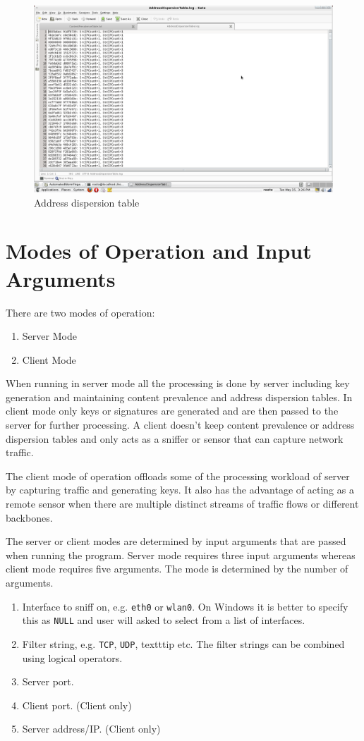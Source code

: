 \documentclass{report}
\begin{document}
\begin{figure}[here]
\centering
\includegraphics[width=\textwidth]{AddressDispersionTable.png}
\caption{Address dispersion table}
\label{AddressDispersionLog}
\end{figure}

\section{Modes of Operation and Input Arguments}
There are two modes of operation:
\begin{enumerate}
\item Server Mode
\item Client Mode
\end{enumerate}

When running in server mode all the processing is done by server including key generation and maintaining content prevalence and address dispersion tables. In client mode only keys or signatures are generated and are then passed to the server for further processing. A client doesn't keep content prevalence or address dispersion tables and only acts as a sniffer or sensor that can capture network traffic.

The client mode of operation offloads some of the processing workload of server by capturing traffic and generating keys. It also has the advantage of acting as a remote sensor when there are multiple distinct streams of traffic flows or different backbones.

The server or client modes are determined by input arguments that are passed when running the program. Server mode requires three input arguments whereas client mode requires five arguments. The mode is determined by the number of arguments.
\begin{enumerate}
\item Interface to sniff on, e.g. \texttt{eth0} or \texttt{wlan0}. On Windows it is better to specify this as \texttt{NULL} and user will asked to select from a list of interfaces.
\item Filter string, e.g. \texttt{TCP}, \texttt{UDP}, texttt{ip} etc. The filter strings can be combined using logical operators.
\item Server port.
\item Client port. (Client only)
\item Server address/IP. (Client only)
\end{enumerate}
\end{document}
